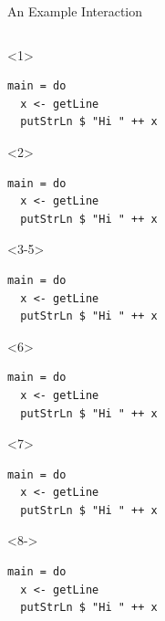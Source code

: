 \documentclass{beamer}
\begin{document}
\begin{frame}[fragile]{An Example Interaction}
  \begin{columns}[t]
    \begin{column}{0.5\textwidth}
\begin{onlyenv}<1>
\begin{verbatim}
main = do
  x <- getLine
  putStrLn $ "Hi " ++ x
\end{verbatim}
\end{onlyenv}
\begin{onlyenv}<2>
\begin{verbatim}
main = do
  x <- getLine
  putStrLn $ "Hi " ++ x
\end{verbatim}
\end{onlyenv}
\begin{onlyenv}<3-5>
\begin{verbatim}
main = do
  x <- getLine
  putStrLn $ "Hi " ++ x
\end{verbatim}
\end{onlyenv}
\begin{onlyenv}<6>
\begin{verbatim}
main = do
  x <- getLine
  putStrLn $ "Hi " ++ x
\end{verbatim}
\end{onlyenv}
\begin{onlyenv}<7>
\begin{verbatim}
main = do
  x <- getLine
  putStrLn $ "Hi " ++ x
\end{verbatim}
\end{onlyenv}
\begin{onlyenv}<8->
\begin{verbatim}
main = do
  x <- getLine
  putStrLn $ "Hi " ++ x
\end{verbatim}
\end{onlyenv}

\end{column}
\end{columns}
\end{frame}
\end{document}
